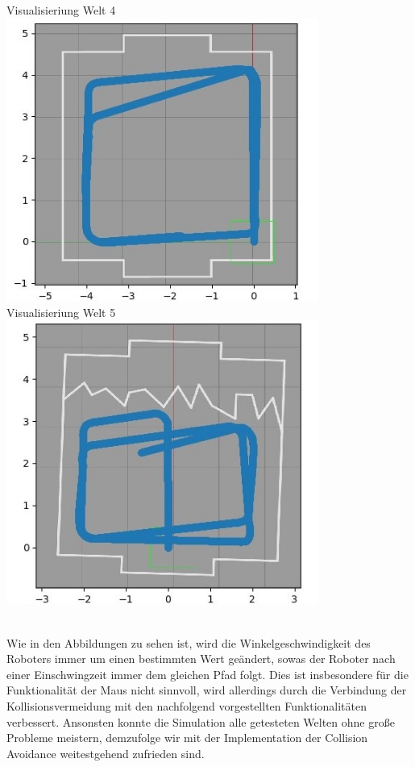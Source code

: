 \documentclass[12pt, a4paper]{report}
\begin{document}
\begin{centering}
Visualisieriung Welt 4\\
\includegraphics[width=290pt]{roboter_pfad4.jpg}\newpage
~\\
Visualisieriung Welt 5\\
\includegraphics[width=290pt]{roboter_pfad5.jpg}\\
\end{centering}
~\\

Wie in den Abbildungen zu sehen ist, wird die Winkelgeschwindigkeit des Roboters immer um einen bestimmten Wert geändert, sowas der Roboter nach einer Einschwingzeit immer dem gleichen Pfad folgt. Dies ist insbesondere für die Funktionalität der Maus nicht sinnvoll, wird allerdings durch die Verbindung der Kollisionsvermeidung mit den nachfolgend vorgestellten Funktionalitäten verbessert. Ansonsten konnte die Simulation alle getesteten Welten ohne große Probleme meistern, demzufolge wir mit der Implementation der Collision Avoidance weitestgehend zufrieden sind.
\newline
\end{document}
